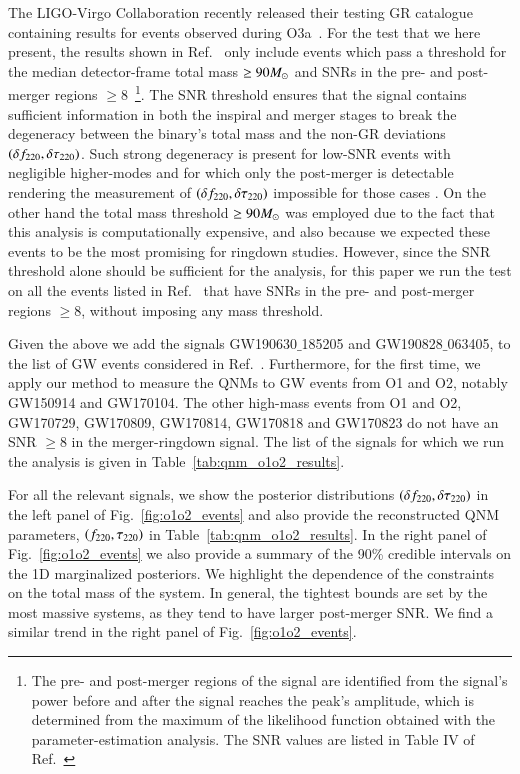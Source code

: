 The LIGO-Virgo Collaboration recently released their testing GR
catalogue containing results for events observed
during O3a~\cite{Abbott:2020jks}. For the test that we here present, the results shown in Ref.~\cite{Abbott:2020jks} only include events which pass a threshold for the median detector-frame total mass $\geq 90 M_{\odot}$ and SNRs in the pre- and
post-merger regions $\geq 8$~\footnote{The pre- and post-merger regions of the signal are identified from the signal's power before and after the signal reaches the peak's amplitude, which is determined from the maximum of the likelihood function obtained with the parameter-estimation analysis. The SNR values are listed in Table IV of Ref.~\cite{Abbott:2020jks}}. 
%
The SNR threshold ensures that the signal contains sufficient
information in both the inspiral and merger stages to break the
degeneracy between the binary's total mass and the non-GR deviations
$(\delta f_{\text{220}}, \delta \tau_{\text{220}})$. Such strong degeneracy is present for
low-SNR events with negligible higher-modes and for which only the
post-merger is detectable rendering the measurement of $(\delta f_{\text{220}},
\delta \tau_{\text{220}})$ impossible for those cases . On the other hand the
total mass threshold $\geq 90 M_{\odot}$ was employed due to the fact that
this analysis is computationally expensive, and also because we
expected these events to be the most promising for ringdown
studies. However, since the SNR threshold alone should be sufficient
for the analysis, for this paper we run the test on all the events
listed in Ref.~\cite{Abbott:2020jks} that have SNRs in the pre- and
post-merger regions $\geq 8$, without imposing any mass threshold.

Given the above we add the signals  GW190630$\_$185205 and GW190828$\_$063405, to the list of GW events considered in Ref.~\cite{Abbott:2020jks}. Furthermore, for the first time, 
we apply our method to measure the QNMs to GW events from O1 and O2, notably GW150914 and GW170104. The other high-mass events from O1 and O2, GW170729, GW170809,
GW170814, GW170818 and GW170823 do not have an SNR $\geq 8$ in the
merger-ringdown signal. The list of the signals for which we run the analysis is given in Table~\ref{tab:qnm_o1o2_results}.
  
For all the relevant signals, we show the posterior distributions
$(\delta f_{\text{220}}, \delta \tau_{\text{220}})$ in the left panel of
Fig.~\ref{fig:o1o2_events} and also provide the reconstructed QNM
parameters, $(f_{\text{220}}, \tau_{\text{220}})$ in
Table~\ref{tab:qnm_o1o2_results}. In the right panel of
Fig.~\ref{fig:o1o2_events} we also provide a summary of the 90\%
credible intervals on the 1D marginalized posteriors. We highlight the
dependence of the constraints on the total mass of the
system. In general, the tightest bounds are set by the 
most massive systems, as they tend to have larger post-merger SNR. We
find a similar trend in the right panel of Fig.~\ref{fig:o1o2_events}.
 
